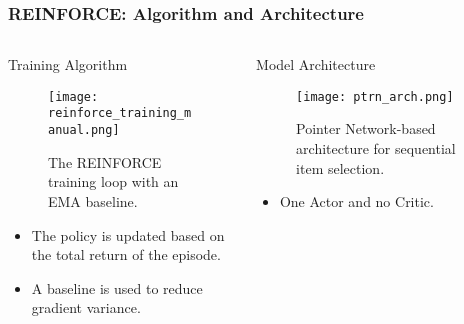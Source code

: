 \begin{frame}
    \frametitle{REINFORCE: Algorithm and Architecture}

    \begin{columns}[T]
        
        \begin{column}{0.5\textwidth}
            \begin{block}{Training Algorithm}
                \begin{figure}
                    \texttt{[image: reinforce\_training\_manual.png]}
                    \caption{The REINFORCE training loop with an EMA baseline.}
                \end{figure}

                \vspace{-1.5em}

                \begin{itemize}
                    \item The policy is updated based on the total return of the episode.
                    \item A baseline is used to reduce gradient variance.
                \end{itemize}
            \end{block}
        \end{column}

        \begin{column}{0.5\textwidth}
            \begin{block}{Model Architecture}
                \begin{figure}
                    \texttt{[image: ptrn\_arch.png]}
                    \caption{Pointer Network-based architecture for sequential item selection.}
                \end{figure}
                \vspace{-1.5em}
                \begin{itemize}
                    \item One Actor and no Critic.
                \end{itemize}
            \end{block}
        \end{column}

    \end{columns}
\end{frame}

